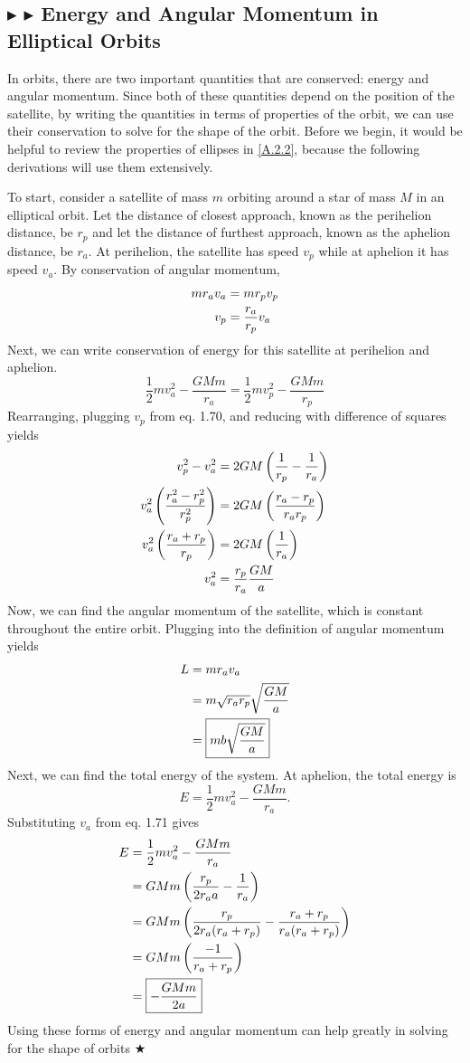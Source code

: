 \subsection{\color{Goldenrod} $\blacktriangleright$ \color{Orchid} $\blacktriangleright$ \color{black} Energy and Angular Momentum in Elliptical Orbits}
In orbits, there are two important quantities that are conserved: energy and angular momentum. Since both of these quantities depend on the position of the satellite, by writing the quantities in terms of properties of the orbit, we can use their conservation to solve for the shape of the orbit. Before we begin, it would be helpful to review the properties of ellipses in \ref{A.2.2}, because the following derivations will use them extensively.

\noindent To start, consider a satellite of mass $m$ orbiting around a star of mass $M$ in an elliptical orbit. Let the distance of closest approach, known as the perihelion distance, be $r_p$ and let the distance of furthest approach, known as the aphelion distance, be $r_a$. At perihelion, the satellite has speed $v_p$ while at aphelion it has speed $v_a$. By conservation of angular momentum,
\begin{align}
    mr_av_a &= mr_pv_p \nonumber \\
    v_p &= \frac{r_a}{r_p}v_a
\end{align}
\noindent Next, we can write conservation of energy for this satellite at perihelion and aphelion.
\begin{equation*}
    \frac12 mv_a^2 -\frac{GMm}{r_a} = \frac12mv_p^2 - \frac{GMm}{r_p}
\end{equation*}
\noindent Rearranging, plugging $v_p$ from eq. 1.70, and reducing with difference of squares yields
\begin{align}
    v_p^2 - v_a^2 &= 2GM\left(\frac{1}{r_p} - \frac{1}{r_a}\right) \nonumber \\
    v_a^2\left(\frac{r_a^2 -r_p^2}{r_p^2}\right) &= 2GM\left(\frac{r_a-r_p}{r_ar_p}\right) \nonumber \\
    v_a^2\left(\frac{r_a +r_p}{r_p}\right) &= 2GM\left(\frac{1}{r_a}\right) \nonumber \\
    v_a^2 &= \frac{r_p}{r_a} \frac{GM}{a}
\end{align}
\noindent Now, we can find the angular momentum of the satellite, which is constant throughout the entire orbit. Plugging into the definition of angular momentum yields
\begin{align}
    L &= mr_av_a \nonumber \\
    &= m\sqrt{r_ar_p}\sqrt{\frac{GM}{a}} \nonumber \\
    &= \boxed{mb\sqrt{\frac{GM}{a}}}
\end{align}
\noindent Next, we can find the total energy of the system. At aphelion, the total energy is 
\begin{equation*}
    E = \frac12 mv_a^2 -\frac{GMm}{r_a}.
\end{equation*}
\noindent Substituting $v_a$ from eq. 1.71 gives
\begin{align}
    E &= \frac12 mv_a^2 -\frac{GMm}{r_a} \nonumber \\
    &= GMm\left(\frac{r_p}{2r_aa} - \frac{1}{r_a}\right) \nonumber \\
    &= GMm\left(\frac{r_p}{2r_a(r_a + r_p)} - \frac{r_a+r_p}{r_a(r_a+r_p)}\right) \nonumber \\
    &= GMm\left(\frac{-1}{r_a+r_p}\right) \nonumber \\
    &= \boxed{-\frac{GMm}{2a}}
\end{align}
\noindent Using these forms of energy and angular momentum can help greatly in solving for the shape of orbits $\bigstar$

